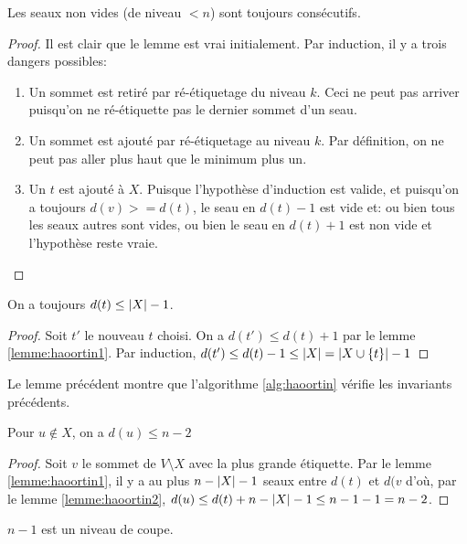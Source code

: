 \documentclass[math, info]{cours}
\begin{document}
\begin{lemme}
	Les seaux non vides (de niveau $< n$) sont toujours consécutifs.
	\label{lemme:haoortin1}
\end{lemme}
\begin{proof}
	Il est clair que le lemme est vrai initialement.
	Par induction, il y a trois dangers possibles:
	\begin{enumerate}
		\item Un sommet est retiré par ré-étiquetage du niveau $k$. Ceci ne peut pas arriver puisqu'on ne ré-étiquette pas le dernier sommet d'un seau.
		\item Un sommet est ajouté par ré-étiquetage au niveau $k$. Par définition, on ne peut pas aller plus haut que le minimum plus un.
		\item Un $t$ est ajouté à $X$. Puisque l'hypothèse d'induction est valide, et puisqu'on a toujours $d(v) >= d(t)$, le seau en $d(t) - 1$ est vide et: ou bien tous les seaux autres sont vides, ou bien le seau en $d(t) + 1$ est non vide et l'hypothèse reste vraie.
	\end{enumerate}
\end{proof}

\begin{lemme}
	On a toujours $d(t) \leq \left|X\right| - 1$.
	\label{lemme:haoortin2}
\end{lemme}
\begin{proof}
	Soit $t'$ le nouveau $t$ choisi.
	On a $d(t') \leq d(t) + 1$ par le lemme \ref{lemme:haoortin1}.
	Par induction, $d(t') \leq d(t) - 1 \leq \left|X\right| = \left|X \cup \{t\}\right| - 1$
\end{proof}

Le lemme précédent montre que l'algorithme \ref{alg:haoortin} vérifie les invariants précédents.

\begin{lemme}
	Pour $u \notin X$, on a $d(u) \leq n - 2$
	\label{lemme:haoortin3}
\end{lemme}
\begin{proof}
	Soit $v$ le sommet de $V \setminus X$ avec la plus grande étiquette.
	Par le lemme \ref{lemme:haoortin1}, il y a au plus $n - \left|X\right| - 1$ seaux entre $d(t)$ et $d(v$ d'où, par le lemme \ref{lemme:haoortin2}, $d(u) \leq d(t) + n - \left|X\right| - 1 \leq n - 1 - 1 = n - 2$.
\end{proof}

\begin{corollaire}
	$n - 1$ est un niveau de coupe.
	\label{corollaire:haoortin1}
\end{corollaire}
\end{document}
